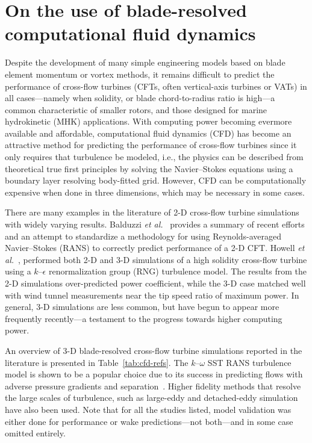\chapter{On the use of blade-resolved computational fluid
    dynamics}\label{chap:CFD}

Despite the development of many simple engineering models based on blade element
momentum or vortex methods, it remains difficult to predict the performance of
cross-flow turbines (CFTs, often vertical-axis turbines or VATs) in all
cases---namely when solidity, or blade chord-to-radius ratio is high---a common
characteristic of smaller rotors, and those designed for marine hydrokinetic
(MHK) applications. With computing power becoming evermore available and
affordable, computational fluid dynamics (CFD) has become an attractive method
for predicting the performance of cross-flow turbines since it only requires
that turbulence be modeled, i.e., the physics can be described from theoretical
true first principles by solving the Navier--Stokes equations using a boundary
layer resolving body-fitted grid. However, CFD can be computationally expensive
when done in three dimensions, which may be necessary in some cases.

There are many examples in the literature of 2-D cross-flow turbine simulations
with widely varying results. Balduzzi \emph{et al.}~\cite{Balduzzi2016} provides
a summary of recent efforts and an attempt to standardize a methodology for
using Reynolds-averaged Navier--Stokes (RANS) to correctly predict performance
of a 2-D CFT. Howell \emph{et al.}~\cite{Howell2010}, performed both 2-D and 3-D
simulations of a high solidity cross-flow turbine using a $k$--$\epsilon$
renormalization group (RNG) turbulence model. The results from the 2-D
simulations over-predicted power coefficient, while the 3-D case matched well
with wind tunnel measurements near the tip speed ratio of maximum power. In
general, 3-D simulations are less common, but have begun to appear more
frequently recently---a testament to the progress towards higher computing
power.

An overview of 3-D blade-resolved cross-flow turbine simulations reported in the
literature is presented in Table~\ref{tab:cfd-refs}. The $k$--$\omega$ SST RANS
turbulence model is shown to be a popular choice due to its success in
predicting flows with adverse pressure gradients and
separation~\cite{Menter2003}. Higher fidelity methods that resolve the large
scales of turbulence, such as large-eddy and detached-eddy simulation have also
been used. Note that for all the studies listed, model validation was either
done for performance or wake predictions---not both---and in some case omitted
entirely.

